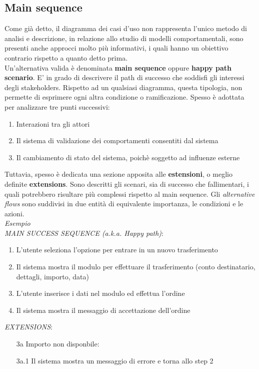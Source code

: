 \documentclass{article}
\begin{document}
\subsection*{Main sequence}
\large
Come già detto, il diagramma dei casi d'uso non rappresenta l'unico metodo di analisi e descrizione, in relazione allo studio di modelli comportamentali, sono presenti anche approcci molto più informativi, i quali hanno un obiettivo contrario rispetto a quanto detto prima.\vspace*{14pt}\\
Un'alternativa valida è denominata \textbf{main sequence} oppure \textbf{happy path scenario}. E' in grado di descrivere il path di successo che soddisfi gli interessi degli stakeholders. Rispetto ad un qualsiasi diagramma, questa tipologia, non permette di esprimere ogni altra condizione o ramificazione. Spesso è adottata per analizzare tre punti successivi:
\begin{enumerate}
    \renewcommand{\labelenumi}{-}
    \itemsep0em
    \item Interazioni tra gli attori 
    \item Il sistema di validazione dei comportamenti consentiti dal sistema
    \item Il cambiamento di stato del sistema, poichè soggetto ad influenze esterne 
\end{enumerate}
Tuttavia, spesso è dedicata una sezione apposita alle \textbf{estensioni}, o meglio definite \textbf{extensions}. Sono descritti gli scenari, sia di successo che fallimentari, i quali potrebbero risultare più complessi rispetto al main sequence. Gli \textit{alternative flows} sono suddivisi in due entità di equivalente importanza, le condizioni e le azioni.\vspace*{14pt}\\
\textit{Esempio}\vspace*{2pt}\\
\textit{MAIN SUCCESS SEQUENCE (a.k.a. Happy path)}:
\begin{enumerate}
    \itemsep0em
    \renewcommand{\leftmargin}{1cm}
    \item L'utente seleziona l'opzione per entrare in un nuovo trasferimento
    \item Il sistema mostra il modulo per effettuare il trasferimento (conto destinatario, dettagli, importo, data)
    \item L'utente inserisce i dati nel modulo ed effettua l'ordine
    \item Il sistema mostra il messaggio di accettazione dell'ordine
\end{enumerate}
\textit{EXTENSIONS}:
\begin{enumerate}[label={\arabic*}, leftmargin=1cm]
    \item[3a] Importo non disponbile:
\end{enumerate}
\begin{enumerate}[label={\arabic*}, leftmargin=1.7cm]
    \item[3a.1] Il sistema mostra un messaggio di errore e torna allo step 2
\end{enumerate}
\end{document}
